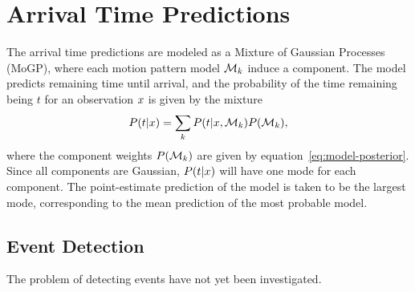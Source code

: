 \section{Arrival Time Predictions}
The arrival time predictions are modeled as a Mixture of Gaussian
Processes (MoGP), where each motion pattern model $\mathcal{M}_{k}$ induce a component. The
model predicts remaining time until arrival, and the probability of
the time remaining being $t$ for an observation $x$ is given by
the mixture
\begin{equation}
  P(t | x) = \sum_{k}P(t | x, \mathcal{M}_{k}) P(\mathcal{M}_{k}),
\end{equation}
where the component weights $P(\mathcal{M}_{k})$ are given by
equation~\ref{eq:model-posterior}. Since all components are Gaussian, 
$P(t | x)$ will have one mode for each component. The
point-estimate prediction of the model is taken to be the largest
mode, corresponding to the mean prediction of the most probable model.


\subsection{Event Detection}
The problem of detecting events have not yet been investigated.